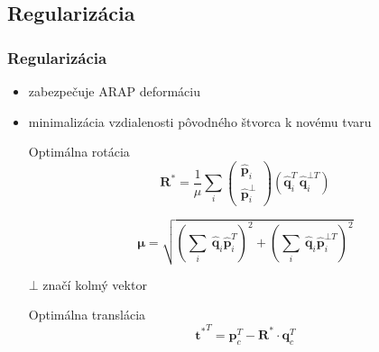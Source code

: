 \documentclass[a4paper]{beamer}
\begin{document}
\subsection{Regularizácia}
\begin{frame}
	\frametitle{Regularizácia}
	\begin{itemize}
		\item zabezpečuje ARAP deformáciu
		\item minimalizácia vzdialenosti pôvodného štvorca k novému tvaru
		
		\begin{block}{Optimálna rotácia}
			\begin{displaymath}
		 		\mathbf{R^*} = \frac{1}{\mu}
		 		 \sum_i\left( 
					\begin{array}{c}
      					\mathbf{\hat{p}}_i \\
      					\mathbf{\hat{p}}^\bot_i
    				\end{array}
		 		 \right)
		 		 \left(
					\mathbf{\hat{q}}^T_i \, \mathbf{\hat{q}}^{\bot T}_i
		 		 \right)
		 	\end{displaymath}

		 	\begin{displaymath}
		 		\mathbf{\mu} = \sqrt{
		 			\left(\sum_i\
		 				\mathbf{\hat{q}}_i
		 				\mathbf{\hat{p}}^T_i
		 			\right)^2
		 			+
		 			\left(\sum_i\
		 				\mathbf{\hat{q}}_i
		 				\mathbf{\hat{p}}^{\bot T}_i
		 			\right)^2
		 		}
		 	\end{displaymath}

		 	\(\bot\) značí kolmý vektor
	 	\end{block}
	 	
	 	\begin{block}{Optimálna translácia}
	 		\begin{displaymath}
		 		\mathbf{t^*}^T = \mathbf{p}^T_c - \mathbf{R^*} \cdot \mathbf{q}^T_c
		 	\end{displaymath}
	 	\end{block}

	\end{itemize}
\end{frame}
\end{document}
